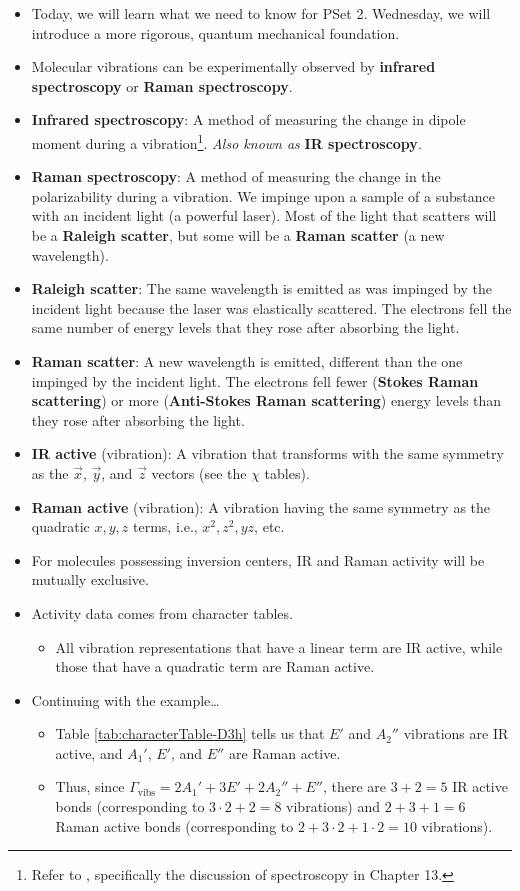 \documentclass[../notes.tex]{subfiles}
\begin{document}
\begin{itemize}
    \item Today, we will learn what we need to know for PSet 2. Wednesday, we will introduce a more rigorous, quantum mechanical foundation.
    \item Molecular vibrations can be experimentally observed by \textbf{infrared spectroscopy} or \textbf{Raman spectroscopy}.
    \item \textbf{Infrared spectroscopy}: A method of measuring the change in dipole moment during a vibration\footnote{Refer to \textcite{bib:APChemNotes}, specifically the discussion of spectroscopy in Chapter 13.}. \emph{Also known as} \textbf{IR spectroscopy}.
    \item \textbf{Raman spectroscopy}: A method of measuring the change in the polarizability during a vibration. We impinge upon a sample of a substance with an incident light (a powerful laser). Most of the light that scatters will be a \textbf{Raleigh scatter}, but some will be a \textbf{Raman scatter} (a new wavelength).
    \item \textbf{Raleigh scatter}: The same wavelength is emitted as was impinged by the incident light because the laser was elastically scattered. The electrons fell the same number of energy levels that they rose after absorbing the light.
    \item \textbf{Raman scatter}: A new wavelength is emitted, different than the one impinged by the incident light. The electrons fell fewer (\textbf{Stokes Raman scattering}) or more (\textbf{Anti-Stokes Raman scattering}) energy levels than they rose after absorbing the light.
    \item \textbf{IR active} (vibration): A vibration that transforms with the same symmetry as the $\vec{x}$, $\vec{y}$, and $\vec{z}$ vectors (see the $\chi$ tables).
    \item \textbf{Raman active} (vibration): A vibration having the same symmetry as the quadratic $x,y,z$ terms, i.e., $x^2,z^2,yz$, etc.
    \item For molecules possessing inversion centers, IR and Raman activity will be mutually exclusive.
    \item Activity data comes from character tables.
    \begin{itemize}
        \item All vibration representations that have a linear term are IR active, while those that have a quadratic term are Raman active.
    \end{itemize}
    \item Continuing with the  example\dots
    \begin{itemize}
        \item Table \ref{tab:characterTable-D3h} tells us that $E'$ and $A_2''$ vibrations are IR active, and $A_1'$, $E'$, and $E''$ are Raman active.
        \item Thus, since $\Gamma_\text{vibs}=2A_1'+3E'+2A_2''+E''$, there are $3+2=5$ IR active bonds (corresponding to $3\cdot 2+2=8$ vibrations) and $2+3+1=6$ Raman active bonds (corresponding to $2+3\cdot 2+1\cdot 2=10$ vibrations).
    \end{itemize}
\end{itemize}
\end{document}
